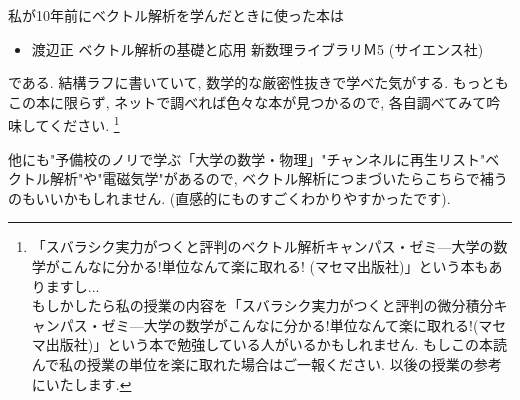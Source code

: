 \documentclass[dvipdfmx,a4paper,11pt]{article}
\theoremstyle{definition}
\begin{document}
私が10年前にベクトル解析を学んだときに使った本は
 \begin{itemize}
\item 渡辺正 ベクトル解析の基礎と応用 新数理ライブラリＭ5 (サイエンス社)
\end{itemize}
である. 結構ラフに書いていて, 数学的な厳密性抜きで学べた気がする.
もっともこの本に限らず, ネットで調べれば色々な本が見つかるので, 各自調べてみて吟味してください. 
\footnote{「スバラシク実力がつくと評判のベクトル解析キャンパス・ゼミ—大学の数学がこんなに分かる!単位なんて楽に取れる! (マセマ出版社)」という本もありますし... \\ もしかしたら私の授業の内容を「スバラシク実力がつくと評判の微分積分キャンパス・ゼミ—大学の数学がこんなに分かる!単位なんて楽に取れる!(マセマ出版社)」という本で勉強している人がいるかもしれません. もしこの本読んで私の授業の単位を楽に取れた場合はご一報ください. 以後の授業の参考にいたします.}

他にも"予備校のノリで学ぶ「大学の数学・物理」"チャンネルに再生リスト"ベクトル解析"や"電磁気学"があるので, ベクトル解析につまづいたらこちらで補うのもいいかもしれません.
(直感的にものすごくわかりやすかったです).
\end{document}
